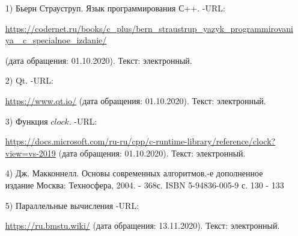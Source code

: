 \documentclass[14pt, a4paper]{extarticle}
\begin{document}
	\begin{enumerate}
		\label{CPlusPlus}
		\item[1)] Бьерн Страуструп. Язык программирования С++. -URL:\par 
		\href{https://codernet.ru/books/c_plus/bern_straustrup_yazyk_programmirovaniya_c_specialnoe_izdanie/}
		{https://codernet.ru/books/c\_plus/bern\_straustrup\_yazyk\_programmirovaniya\_
			c\_specialnoe\_izdanie/}\par(дата обращения:
		01.10.2020). Текст: электронный.
		
		\label{Cute}
		\item[2)] Qt. -URL:\par
		\href{https://www.qt.io/}{https://www.qt.io/} (дата обращения: 01.10.2020). Текст: электронный.
		
		\label{CLOCK}
		\item[3)] Функция $clock$. -URL:\par
		\href{https://docs.microsoft.com/ru-ru/cpp/c-runtime-library/reference/clock?view=vs-2019}{https://docs.microsoft.com/ru-ru/cpp/c-runtime-library/reference/clock?view=vs-2019} (дата обращения:
		01.10.2020). Текст: электронный.
		
		\label{MatrixInfo}
		\item[4)] Дж. Макконнелл. Основы современных алгоритмов.-е дополненное издание
		\newline Москва: Техносфера, 2004. - 368с. ISBN 5-94836-005-9\newline
		с. 130 - 133
		
		\label{ParInfo}
		\item[5)] Параллельные вычисления -URL:\par
		\href{https://ru.bmstu.wiki/}{https://ru.bmstu.wiki/} (дата обращения:
		13.11.2020). Текст: электронный.
		
	\end{enumerate}
\end{document}
